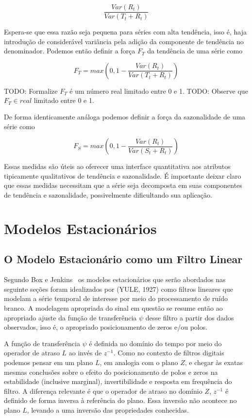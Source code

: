 $$ \frac{Var(R_t)}{Var(T_t + R_t)} $$

Espera-se que essa razão seja pequena para séries com alta tendência, isso é,
haja introdução de considerável variância pela adição da componente de
tendência no denominador. Podemos então definir a força $F_T$ da tendência de
uma série como

$$ F_T = max\left(0, 1 - \frac{Var(R_t)}{Var(T_t + R_t)}\right) $$

TODO: Formalize $F_T$ é um número real limitado entre 0 e 1.
TODO: Observe que $F_T \in real$ limitado entre 0 e 1.

De forma identicamente análoga podemos definir a força da sazonalidade de uma
série como

$$ F_S = max\left(0, 1 - \frac{Var(R_t)}{Var(S_t + R_t)}\right) $$

Essas medidas são úteis ao oferecer uma interface quantitativa aos atributos
tipicamente qualitativos de tendência e sazonalidade. É importante deixar
claro que essas medidas necessitam que a série seja decomposta em suas
componentes de tendência e sazonalidade, possivelmente dificultando sua
aplicação.

\section{Modelos Estacionários}

\subsection{O Modelo Estacionário como um Filtro Linear}

Segundo Box e Jenkins~\cite[capítulo~1.2.1]{box} os modelos estacionários que
serão abordados nas seguinte seções foram idealizados por (YULE, 1927) como
filtros lineares que modelam a série temporal de interesse por meio do
processamento de ruído branco. A modelagem apropriada do sinal em questão se
resume então ao apropriado ajuste da função de transferência $\psi$ desse
filtro a partir dos dados observados, isso é, o apropriado posicionamento de
zeros e/ou polos.

A função de transferência $\psi$ é definida no domínio do tempo por meio do
operador de atraso $L$ ao invés de $z^{-1}$. Como no contexto de filtros
digitais podemos pensar em um plano $L$, em analogia com o plano $Z$, e chegar às
exatas mesmas conclusões sobre o efeito do posicionamento de polos e zeros na
estabilidade (inclusive marginal), invertibilidade e resposta em frequência do
filtro. A diferença relevante é que o operador de atraso no domínio $Z$,
$z^{-1}$ é definido de forma inversa à referência do plano. Essa inversão não
acontece no plano $L$, levando a uma inversão das propriedades conhecidas.

